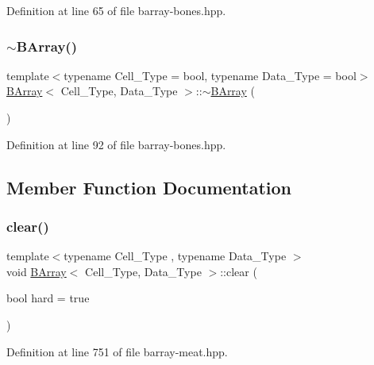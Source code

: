 Definition at line 65 of file barray-\/bones.\+hpp.

\mbox{\label{class_b_array_af39acdf29aa5999a7f5fd48141be384e}} 
\subsubsection{\texorpdfstring{$\sim$\+B\+Array()}{~BArray()}}
{\footnotesize\ttfamily template$<$typename Cell\+\_\+\+Type = bool, typename Data\+\_\+\+Type = bool$>$ \\
\hyperlink{class_b_array}{B\+Array}$<$ Cell\+\_\+\+Type, Data\+\_\+\+Type $>$\+::$\sim$\hyperlink{class_b_array}{B\+Array} (\begin{DoxyParamCaption}{ }\end{DoxyParamCaption})\hspace{0.3cm}{\ttfamily [inline]}}



Definition at line 92 of file barray-\/bones.\+hpp.



\subsection{Member Function Documentation}
\mbox{\label{class_b_array_a6dd5ebff333b376c6fb569e48290935f}} 
\subsubsection{\texorpdfstring{clear()}{clear()}}
{\footnotesize\ttfamily template$<$typename Cell\+\_\+\+Type , typename Data\+\_\+\+Type $>$ \\
void \hyperlink{class_b_array}{B\+Array}$<$ Cell\+\_\+\+Type, Data\+\_\+\+Type $>$\+::clear (\begin{DoxyParamCaption}\item[{bool}]{hard = {\ttfamily true} }\end{DoxyParamCaption})\hspace{0.3cm}{\ttfamily [inline]}}



Definition at line 751 of file barray-\/meat.\+hpp.

\mbox{\label{class_b_array_a4096e4447f91ba52766587a08c62f1fa}} 
